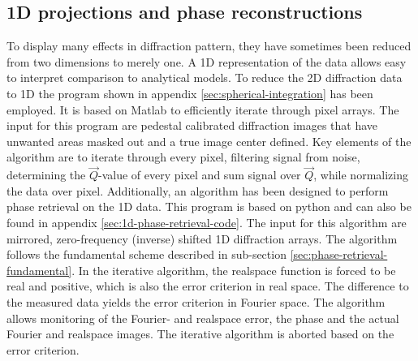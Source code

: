 \subsection{1D projections and phase reconstructions}\label{sec:1d-proj-and-phase-reconstruction}
To display many effects in diffraction pattern, they have sometimes been reduced from two dimensions to merely one. A 1D representation of the data allows easy to interpret comparison to analytical models. To reduce the 2D diffraction data to 1D the program shown in appendix \ref{sec:spherical-integration} has been employed. It is based on Matlab to efficiently iterate through pixel arrays. The input for this program are pedestal calibrated diffraction images that have unwanted areas masked out and a true image center defined. Key elements of the algorithm are to iterate through every pixel, filtering signal from noise, determining the $\vec{Q}$-value of every pixel and sum signal over $\vec{Q}$, while normalizing the data over pixel. Additionally, an algorithm has been designed to perform phase retrieval on the 1D data. This program is based on python and can also be found in appendix \ref{sec:1d-phase-retrieval-code}. The input for this algorithm are mirrored, zero-frequency (inverse) shifted 1D diffraction arrays. The algorithm follows the fundamental scheme described in sub-section \ref{sec:phase-retrieval-fundamental}. In the iterative algorithm, the realspace function is forced to be real and positive, which is also the error criterion in real space. The difference to the measured data yields the error criterion in Fourier space. The algorithm allows monitoring of the Fourier- and realspace error, the phase and the actual Fourier and realspace images. The iterative algorithm is aborted based on the error criterion.
%
%
%
